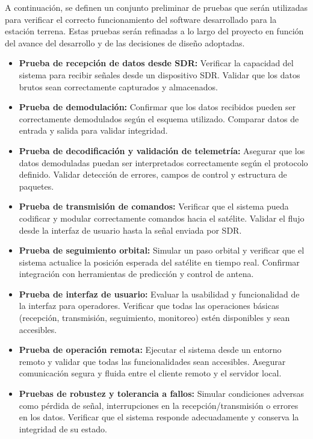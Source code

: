 
A continuación, se definen un conjunto preliminar de pruebas que serán utilizadas para verificar el correcto funcionamiento del software desarrollado para la estación terrena. Estas pruebas serán refinadas a lo largo del proyecto en función del avance del desarrollo y de las decisiones de diseño adoptadas.

\begin{itemize}
    \item \textbf{Prueba de recepción de datos desde SDR:} Verificar la capacidad del sistema para recibir señales desde un dispositivo SDR. Validar que los datos brutos sean correctamente capturados y almacenados.

    \item \textbf{Prueba de demodulación:} Confirmar que los datos recibidos pueden ser correctamente demodulados según el esquema utilizado. Comparar datos de entrada y salida para validar integridad.

    \item \textbf{Prueba de decodificación y validación de telemetría:} Asegurar que los datos demoduladas puedan ser interpretados correctamente según el protocolo definido. Validar detección de errores, campos de control y estructura de paquetes.

    \item \textbf{Prueba de transmisión de comandos:} Verificar que el sistema pueda codificar y modular correctamente comandos hacia el satélite. Validar el flujo desde la interfaz de usuario hasta la señal enviada por SDR.

    \item \textbf{Prueba de seguimiento orbital:} Simular un paso orbital y verificar que el sistema actualice la posición esperada del satélite en tiempo real. Confirmar integración con herramientas de predicción y control de antena.

    \item \textbf{Prueba de interfaz de usuario:} Evaluar la usabilidad y funcionalidad de la interfaz para operadores. Verificar que todas las operaciones básicas (recepción, transmisión, seguimiento, monitoreo) estén disponibles y sean accesibles.

    \item \textbf{Prueba de operación remota:} Ejecutar el sistema desde un entorno remoto y validar que todas las funcionalidades sean accesibles. Asegurar comunicación segura y fluida entre el cliente remoto y el servidor local.

    \item \textbf{Pruebas de robustez y tolerancia a fallos:} Simular condiciones adversas como pérdida de señal, interrupciones en la recepción/transmisión o errores en los datos. Verificar que el sistema responde adecuadamente y conserva la integridad de su estado.
\end{itemize}